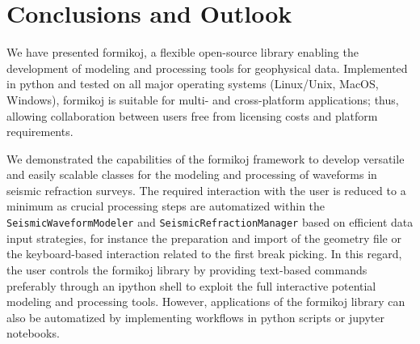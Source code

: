 \documentclass[a4paper,fleqn]{cas-sc}
\begin{document}
\section{Conclusions and Outlook}

We have presented formikoj, a flexible open-source library enabling the development of modeling and processing tools for geophysical data. Implemented in python and tested on all major operating systems (Linux/Unix, MacOS, Windows), formikoj is suitable for multi- and cross-platform applications; thus, allowing collaboration between users free from licensing costs and platform requirements.

We demonstrated the capabilities of the formikoj framework to develop versatile and easily scalable classes for the modeling and processing of waveforms in seismic refraction surveys. The required interaction with the user is reduced to a minimum as crucial processing steps are automatized within the \texttt{SeismicWaveformModeler} and \texttt{SeismicRefractionManager} based on efficient data input strategies, for instance the preparation and import of the geometry file or the keyboard-based interaction related to the first break picking. In this regard, the user controls the formikoj library by providing text-based commands preferably through an ipython shell to exploit the full interactive potential modeling and processing tools. However, applications of the formikoj library can also be automatized by implementing workflows in python scripts or jupyter notebooks.

\end{document}
